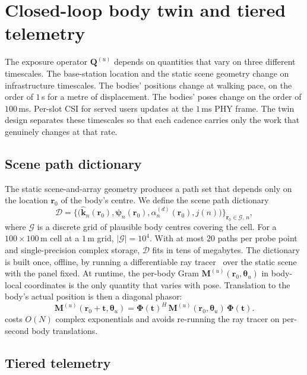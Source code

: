 \documentclass[journal,twocolumn,10pt]{IEEEtran}
\theoremstyle{plain}
\theoremstyle{remark}
\newcommand{\khat}{\hat{\bm{k}}}
\newcommand{\rr}{\mathbf{r}}
\newcommand{\Qmat}{\mathbf{Q}}
\newcommand{\Mmat}{\mathbf{M}}
\newcommand{\Phimat}{\mathbf{\Phi}}
\newcommand{\psin}{\bm{\psi}_n}
\newcommand{\Dict}{\mathcal{D}}
\begin{document}
\section{Closed-loop body twin and tiered telemetry}\label{sec:twin}

The exposure operator $\Qmat^{(u)}$ depends on quantities that vary
on three different timescales. The base-station location and the
static scene geometry change on infrastructure timescales. The
bodies' positions change at walking pace, on the order of $1\,$s for
a metre of displacement. The bodies' poses change on the order of
$100\,$ms. Per-slot CSI for served users updates at the $1\,$ms PHY
frame. The twin design separates these timescales so that each
cadence carries only the work that genuinely changes at that rate.

\subsection{Scene path dictionary}\label{sec:dict}

The static scene-and-array geometry produces a path set that depends
only on the location $\rr_0$ of the body's centre. We define the
scene path dictionary
\begin{equation}\label{eq:dict-def}
  \Dict = \bigl\{\bigl(\khat_n(\rr_0), \psin(\rr_0),
  \alpha_n^{(d)}(\rr_0), j(n)\bigr)\bigr\}_{\rr_0 \in \mathcal{G},\,n},
\end{equation}
where $\mathcal{G}$ is a discrete grid of plausible body centres
covering the cell. For a $100 \times 100\,$m cell at a $1\,$m grid,
$|\mathcal{G}| = 10^4$. With at most $20$ paths per probe point and
single-precision complex storage, $\Dict$ fits in tens of megabytes.
The dictionary is built once, offline, by running a differentiable
ray tracer~\cite{SionnaRT,DiffeRT} over the static scene with the
panel fixed. At runtime, the per-body Gram
$\Mmat^{(u)}(\rr_0, \bm\theta_u)$ in body-local coordinates is the
only quantity that varies with pose. Translation to the body's actual
position is then a diagonal phasor:
\begin{equation}\label{eq:translation}
  \Mmat^{(u)}(\rr_0 + \mathbf{t}, \bm\theta_u) =
  \Phimat(\mathbf{t})^H\,\Mmat^{(u)}(\rr_0, \bm\theta_u)\,
  \Phimat(\mathbf{t}).
\end{equation}
 costs $O(N)$ complex exponentials and avoids
re-running the ray tracer on per-second body translations.

\subsection{Tiered telemetry}\label{sec:tiers}
\end{document}
